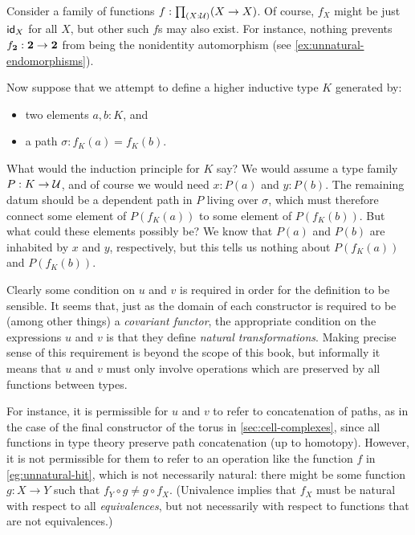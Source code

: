 \begin{eg}\label{eg:unnatural-hit}
  Consider a family of functions $f:\prd{X:\type} (X\to X)$.
  Of course, $f_X$ might be just $\idfunc[X]$ for all $X$, but other such $f$s may also exist.
  For instance, nothing prevents $f_{\bool}:\bool\to\bool$ from being the nonidentity automorphism (see \autoref{ex:unnatural-endomorphisms}).

  Now suppose that we attempt to define a higher inductive type $K$ generated by:
  \begin{itemize}
  \item two elements $a,b:K$, and
  \item a path $\sigma:f_K(a)=f_K(b)$.
  \end{itemize}
  What would the induction principle for $K$ say?
  We would assume a type family $P:K\to\type$, and of course we would need $x:P(a)$ and $y:P(b)$.
  The remaining datum should be a dependent path in $P$ living over $\sigma$, which must therefore connect some element of $P(f_K(a))$ to some element of $P(f_K(b))$.
  But what could these elements possibly be?
  We know that $P(a)$ and $P(b)$ are inhabited by $x$ and $y$, respectively, but this tells us nothing about $P(f_K(a))$ and $P(f_K(b))$.
\end{eg}

Clearly some condition on $u$ and $v$ is required in order for the definition to be sensible.
It seems that, just as the domain of each constructor is required to be (among other things) a \emph{covariant functor}, the appropriate condition on the expressions $u$ and $v$ is that they define \emph{natural transformations}.
Making precise sense of this requirement is beyond the scope of this book, but informally it means that $u$ and $v$ must only involve operations which are preserved by all functions between types.

For instance, it is permissible for $u$ and $v$ to refer to concatenation of paths, as in the case of the final constructor of the torus in \autoref{sec:cell-complexes}, since all functions in type theory preserve path concatenation (up to homotopy).
However, it is not permissible for them to refer to an operation like the function $f$ in \autoref{eg:unnatural-hit}, which is not necessarily natural: there might be some function $g:X\to Y$ such that $f_Y \circ g \neq g\circ f_X$.
(Univalence implies that $f_X$ must be natural with respect to all \emph{equivalences}, but not necessarily with respect to functions that are not equivalences.)

